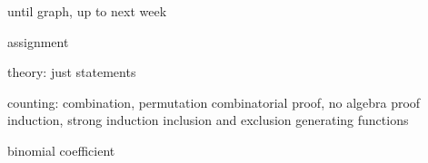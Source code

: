 until graph, up to next week

assignment

theory: just statements

counting: combination, permutation
combinatorial proof, no algebra proof
induction, strong induction
inclusion and exclusion
generating functions

binomial coefficient